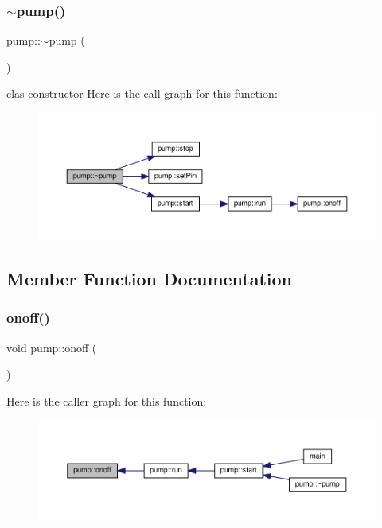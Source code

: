 \subsubsection{\texorpdfstring{$\sim$pump()}{~pump()}}
{\footnotesize\ttfamily pump\+::$\sim$pump (\begin{DoxyParamCaption}{ }\end{DoxyParamCaption})\hspace{0.3cm}{\ttfamily [inline]}}

clas constructor Here is the call graph for this function\+:
\nopagebreak
\begin{figure}[H]
\begin{center}
\leavevmode
\includegraphics[width=350pt]{classpump_a17a634b5d8443578744bbd4c9eff9d87_cgraph}
\end{center}
\end{figure}


\subsection{Member Function Documentation}
\mbox{\label{classpump_af6264b2a6b6e66ed1027565a44561647}} 
\subsubsection{\texorpdfstring{onoff()}{onoff()}}
{\footnotesize\ttfamily void pump\+::onoff (\begin{DoxyParamCaption}{ }\end{DoxyParamCaption})\hspace{0.3cm}{\ttfamily [private]}}

Here is the caller graph for this function\+:
\nopagebreak
\begin{figure}[H]
\begin{center}
\leavevmode
\includegraphics[width=350pt]{classpump_af6264b2a6b6e66ed1027565a44561647_icgraph}
\end{center}
\end{figure}
\mbox{\label{classpump_a058e2690d8022501b5dfdc4ca646cb7c}} 
